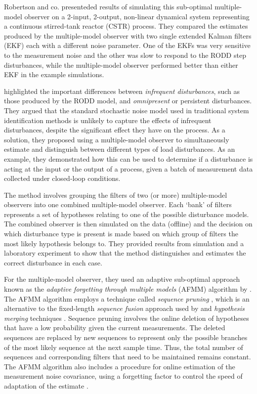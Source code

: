 Robertson and co. presenteded results of simulating this sub-optimal multiple-model observer on a 2-input, 2-output, non-linear dynamical system representing a continuous stirred-tank reactor (CSTR) process. They compared the estimates produced by the multiple-model observer with two single extended Kalman filters (\gls{EKF}) each with a different noise parameter. One of the \gls{EKF}s was very sensitive to the measurement noise and the other was slow to respond to the \gls{RODD} step disturbances, while the multiple-model observer performed better than either \gls{EKF} in the example simulations.

\cite{eriksson_classification_1996} highlighted the important differences between \textit{infrequent disturbances}, such as those produced by the \gls{RODD} model, and \textit{omnipresent} or persistent disturbances. They argued that the standard stochastic noise model used in traditional system identification methods is unlikely to capture the effects of infrequent disturbances, despite the significant effect they have on the process. As a solution, they proposed using a multiple-model observer to simultaneously estimate and distinguish between different types of load disturbances. As an example, they demonstrated how this can be used to determine if a disturbance is acting at the input or the output of a process, given a batch of measurement data collected under closed-loop conditions.

The method involves grouping the filters of two (or more) multiple-model observers into one combined multiple-model observer. Each `bank' of filters represents a set of hypotheses relating to one of the possible disturbance models. The combined observer is then simulated on the data (offline) and the decision on which disturbance type is present is made based on which group of filters the most likely hypothesis belongs to. They provided results from simulation and a laboratory experiment to show that the method distinguishes and estimates the correct disturbance in each case.

For the multiple-model observer, they used an adaptive sub-optimal approach known as the \textit{adaptive forgetting through multiple models} (\gls{AFMM}) algorithm by \cite{andersson_adaptive_1985}. The \gls{AFMM} algorithm employs a technique called \textit{sequence pruning} \citep{tugnait_detection_1982}, which is an alternative to the fixed-length \textit{sequence fusion} approach used by \cite{robertson_detection_1995} and \textit{hypothesis merging} techniques \citep{blom_interacting_1988}. Sequence pruning involves the online deletion of hypotheses that have a low probability given the current measurements. The deleted sequences are replaced by new sequences to represent only the possible branches of the most likely sequence at the next sample time. Thus, the total number of sequences and corresponding filters that need to be maintained remains constant. The \gls{AFMM} algorithm also includes a procedure for online estimation of the measurement noise covariance, using a forgetting factor to control the speed of adaptation of the estimate \citep{andersson_adaptive_1985}.

